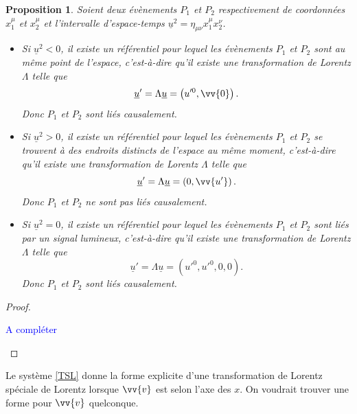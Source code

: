 \documentclass[a4paper,11pt]{report}
\theoremstyle{definition}
\theoremstyle{plain}
\newtheorem{prop}[thm]{Proposition}
\theoremstyle{definition}
\theoremstyle{remark}
\newcommand{\comp}{\begin{center}\textcolor{blue}{A compléter}\end{center}}
\begin{document}
            \begin{prop}
                Soient deux évènements $P_1$ et $P_2$ respectivement de coordonnées $x_1^\mu$ et $x_2^\mu$ et l'intervalle d'espace-temps $\underline{u}^2 = \eta_{\mu\nu}x_1^\mu x_2^\nu$.
                \begin{itemize}[label = \textbullet]
                    \item Si $\underline{u}^2<0$, il existe un référentiel pour lequel les évènements $P_1$ et $P_2$ sont au même point de l'espace, c'est-à-dire qu'il existe une transformation de Lorentz $\Lambda$ telle que
                    \begin{equation}
                        \underline{u}' = \Lambda \underline{u} = \left(u'^0,\vv{0}\right).
                    \end{equation}
                    Donc $P_1$ et $P_2$ sont liés causalement.
                    \item Si $\underline{u}^2>0$, il existe un référentiel pour lequel les évènements $P_1$ et $P_2$ se trouvent à des endroits distincts de l'espace au même moment, c'est-à-dire qu'il existe une transformation de Lorentz $\Lambda$ telle que
                    \begin{equation}
                        \underline{u}' = \Lambda \underline{u} = \left(0,\vv{u'}\right).
                    \end{equation}
                    Donc $P_1$ et $P_2$ ne sont pas liés causalement.
                    \item Si $\underline{u}^2=0$, il existe un référentiel pour lequel les évènements $P_1$ et $P_2$ sont liés par un signal lumineux, c'est-à-dire qu'il existe une transformation de Lorentz $\Lambda$ telle que
                    \begin{equation}
                        \underline{u}' = \Lambda \underline{u} = \left(u'^0,u'^0,0,0\right).
                    \end{equation}
                    Donc $P_1$ et $P_2$ sont liés causalement.
                \end{itemize}
            \end{prop}
            
            \begin{proof}${}$\\
                \comp
            \end{proof}
            
            Le système \ref{TSL} donne la forme explicite d'une transformation de Lorentz spéciale de Lorentz lorsque $\vv{v}$ est selon l'axe des $x$. On voudrait trouver une forme pour $\vv{v}$ quelconque.
            
\end{document}
